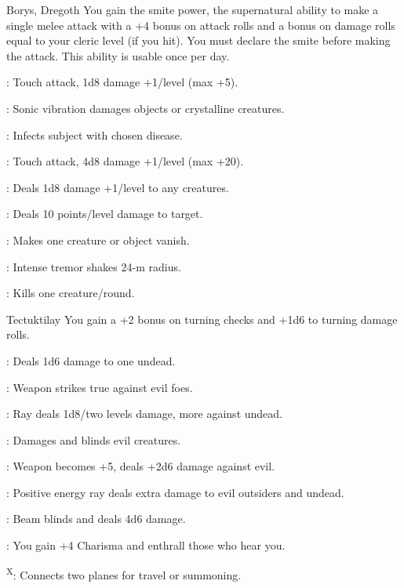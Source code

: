 {Borys, Dregoth}
{You gain the smite power, the supernatural ability to make a single melee attack with a +4 bonus on attack rolls and a bonus on damage rolls equal to your cleric level (if you hit). You must declare the smite before making the attack. This ability is usable once per day.}
{
	\item {}: Touch attack, 1d8 damage +1/level (max +5).
	\item {}: Sonic vibration damages objects or crystalline creatures.
	\item {}: Infects subject with chosen disease.
	\item {}: Touch attack, 4d8 damage +1/level (max +20).
	\item {}: Deals 1d8 damage +1/level to any creatures.
	\item {}: Deals 10 points/level damage to target.
	\item {}: Makes one creature or object vanish.
	\item {}: Intense tremor shakes 24-m radius.
	\item {}: Kills one creature/round.
}

{Tectuktilay}
{You gain a +2 bonus on turning checks and +1d6 to turning damage rolls.}
{
	\item {}: Deals 1d6 damage to one undead.
	\item {}: Weapon strikes true against evil foes.
	\item {}: Ray deals 1d8/two levels damage, more against undead.
	\item {}: Damages and blinds evil creatures.
	\item {}: Weapon becomes +5, deals +2d6 damage against evil.
	\item {}: Positive energy ray deals extra damage to evil outsiders and undead.
	\item {}: Beam blinds and deals 4d6 damage.
	\item {}: You gain +4 Charisma and enthrall those who hear you.
	\item {}\textsuperscript{X}: Connects two planes for travel or summoning.
}


